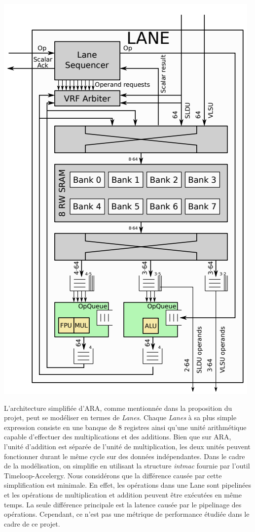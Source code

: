 \documentclass[10pt,letterpaper]{article}
\begin{document}
\begin{multicols}{2}
    {\centering
    \includegraphics[width=0.75\linewidth]{lane_arch.png}
    \captionsetup{hypcap=false}
    \label{fig:lane_arch}}
    \bigskip

    L'architecture simplifiée d'ARA, comme mentionnée dans la proposition du projet, peut se modéliser en termes de 
    \textit{Lanes}. Chaque \textit{Lanes} à sa plus simple expression consiste en une banque de 8 registres ainsi qu'une
    unité arithmétique capable d'effectuer des multiplications et des additions. Bien que sur ARA, l'unité d'addition 
    est séparée de l'unité de multiplication, les deux unités peuvent fonctionner durant le même cycle sur des données
    indépendantes. Dans le cadre de la modélisation, on simplifie en utilisant la structure \textit{intmac} fournie par
    l'outil Timeloop-Accelergy. Nous considérons que la différence causée par cette simplification est minimale. En effet,
    les opérations dans une Lane sont pipelinées et les opérations de multiplication et addition peuvent être exécutées en même temps.
    La seule différence principale est la latence causée par le pipelinage des opérations. Cependant, ce n'est pas une métrique
    de performance étudiée dans le cadre de ce projet.


\end{multicols}
\end{document}
